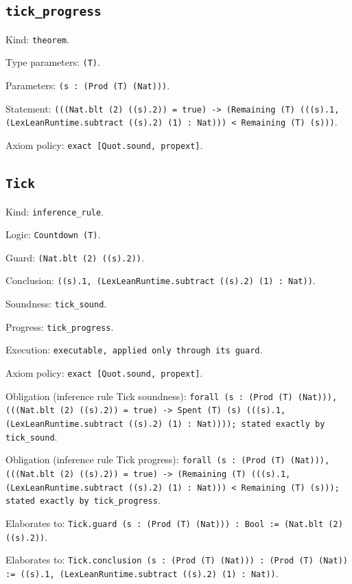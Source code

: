 \documentclass[11pt]{article}
\begin{document}
\subsection*{\texttt{tick\_progress}}
\noindent Kind: \texttt{theorem}.\par
\noindent Type parameters: \texttt{(T)}.\par
\noindent Parameters: \texttt{(s : (Prod (T) (Nat)))}.\par
\noindent Statement: \texttt{(((Nat.blt (2) ((s).2)) = true) -> (Remaining (T) (((s).1, (LexLeanRuntime.subtract ((s).2) (1) : Nat))) < Remaining (T) (s)))}.\par
\noindent Axiom policy: \texttt{exact [Quot.sound, propext]}.\par
\subsection*{\texttt{Tick}}
\noindent Kind: \texttt{inference_rule}.\par
\noindent Logic: \texttt{Countdown (T)}.\par
\noindent Guard: \texttt{(Nat.blt (2) ((s).2))}.\par
\noindent Conclusion: \texttt{((s).1, (LexLeanRuntime.subtract ((s).2) (1) : Nat))}.\par
\noindent Soundness: \texttt{tick\_sound}.\par
\noindent Progress: \texttt{tick\_progress}.\par
\noindent Execution: \texttt{executable, applied only through its guard}.\par
\noindent Axiom policy: \texttt{exact [Quot.sound, propext]}.\par
\noindent Obligation (inference rule Tick soundness): \texttt{forall (s : (Prod (T) (Nat))), (((Nat.blt (2) ((s).2)) = true) -> Spent (T) (s) (((s).1, (LexLeanRuntime.subtract ((s).2) (1) : Nat)))); stated exactly by tick\_sound}.\par
\noindent Obligation (inference rule Tick progress): \texttt{forall (s : (Prod (T) (Nat))), (((Nat.blt (2) ((s).2)) = true) -> (Remaining (T) (((s).1, (LexLeanRuntime.subtract ((s).2) (1) : Nat))) < Remaining (T) (s))); stated exactly by tick\_progress}.\par
\noindent Elaborates to: \texttt{Tick.guard (s : (Prod (T) (Nat))) : Bool := (Nat.blt (2) ((s).2))}.\par
\noindent Elaborates to: \texttt{Tick.conclusion (s : (Prod (T) (Nat))) : (Prod (T) (Nat)) := ((s).1, (LexLeanRuntime.subtract ((s).2) (1) : Nat))}.\par
\end{document}
